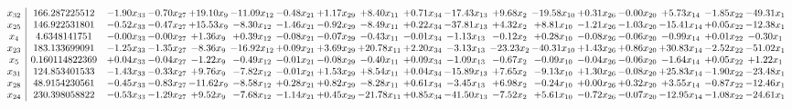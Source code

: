 \documentclass[9pt]{article}
\begin{document}
 \[\begin{array}{c| c c@{\hskip 2pt} c@{\hskip 2pt} c@{\hskip 2pt} c@{\hskip 2pt} c@{\hskip 2pt} c@{\hskip 2pt} c@{\hskip 2pt} c@{\hskip 2pt} c@{\hskip 2pt} c@{\hskip 2pt} c@{\hskip 2pt} c@{\hskip 2pt} c@{\hskip 2pt} c@{\hskip 2pt} c@{\hskip 2pt} c@{\hskip 2pt} }
 x_{32}   &  166.287225512 & -1.90 x_{33} & -0.70 x_{27} & + 19.10 x_{9} & -11.09 x_{12} & -0.48 x_{21} & +  1.17 x_{29} & +  8.40 x_{11} & +  0.71 x_{34} & -17.43 x_{13} & +  9.68 x_{2} & -19.58 x_{10} & +  0.31 x_{26} & -0.00 x_{20} & +  5.73 x_{14} & -1.85 x_{22} & -49.31 x_{1}\\
 x_{25}   &  146.922531801 & -0.52 x_{33} & -0.47 x_{27} & + 15.53 x_{9} & -8.30 x_{12} & -1.46 x_{21} & -0.92 x_{29} & -8.49 x_{11} & +  0.22 x_{34} & -37.81 x_{13} & +  4.32 x_{2} & +  8.81 x_{10} & -1.21 x_{26} & -1.03 x_{20} & -15.41 x_{14} & +  0.05 x_{22} & -12.38 x_{1}\\
 x_{4}   &  4.6348141751 & -0.00 x_{33} & -0.00 x_{27} & +  1.36 x_{9} & +  0.39 x_{12} & -0.08 x_{21} & -0.07 x_{29} & -0.43 x_{11} & -0.01 x_{34} & -1.13 x_{13} & -0.12 x_{2} & +  0.28 x_{10} & -0.08 x_{26} & -0.06 x_{20} & -0.99 x_{14} & +  0.01 x_{22} & -0.30 x_{1}\\
 x_{23}   &  183.133699091 & -1.25 x_{33} & -1.35 x_{27} & -8.36 x_{9} & -16.92 x_{12} & +  0.09 x_{21} & +  3.69 x_{29} & + 20.78 x_{11} & +  2.20 x_{34} & -3.13 x_{13} & -23.23 x_{2} & -40.31 x_{10} & +  1.43 x_{26} & +  0.86 x_{20} & + 30.83 x_{14} & -2.52 x_{22} & -51.02 x_{1}\\
 x_{5}   &  0.160114822369 & +  0.04 x_{33} & -0.04 x_{27} & -1.22 x_{9} & -0.49 x_{12} & -0.01 x_{21} & -0.08 x_{29} & -0.40 x_{11} & +  0.09 x_{34} & -1.09 x_{13} & -0.67 x_{2} & -0.09 x_{10} & -0.04 x_{26} & -0.06 x_{20} & -1.64 x_{14} & +  0.05 x_{22} & +  1.22 x_{1}\\
 x_{31}   &  124.853401533 & -1.43 x_{33} & -0.33 x_{27} & +  9.76 x_{9} & -7.82 x_{12} & -0.01 x_{21} & +  1.53 x_{29} & +  8.54 x_{11} & +  0.04 x_{34} & -15.89 x_{13} & +  7.65 x_{2} & -9.13 x_{10} & +  1.30 x_{26} & -0.08 x_{20} & + 25.83 x_{14} & -1.90 x_{22} & -23.48 x_{1}\\
 x_{28}   &  48.9154230561 & -0.45 x_{33} & -0.83 x_{27} & -11.62 x_{9} & -8.58 x_{12} & +  0.28 x_{21} & +  0.82 x_{29} & -8.28 x_{11} & +  0.61 x_{34} & -3.45 x_{13} & +  6.98 x_{2} & -0.24 x_{10} & +  0.00 x_{26} & +  0.32 x_{20} & +  3.55 x_{14} & -0.87 x_{22} & -12.46 x_{1}\\
 x_{24}   &  230.398058822 & -0.53 x_{33} & -1.29 x_{27} & +  9.52 x_{9} & -7.68 x_{12} & -1.14 x_{21} & +  0.45 x_{29} & -21.78 x_{11} & +  0.85 x_{34} & -41.50 x_{13} & -7.52 x_{2} & +  5.61 x_{10} & -0.72 x_{26} & -0.07 x_{20} & -12.95 x_{14} & -1.08 x_{22} & -24.61 x_{1}\\

\end{array}\]
\end{document}
